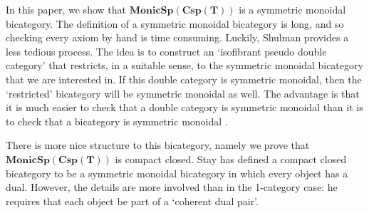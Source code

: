 \documentclass[11pt]{amsart}
\newcommand{\bimonspcsp}[1]{\mathbf{MonicSp(Csp(#1))}}
\theoremstyle{remark}
\theoremstyle{definition}
\begin{document}
In this paper, we show that $\bimonspcsp{T}$ is a symmetric monoidal bicategory. The definition of a symmetric monoidal bicategory is long, 
and so checking every axiom by hand is time consuming. 
Luckily, Shulman 
	\cite{Shul} 
provides a less tedious process. 
The idea is to construct an `isofibrant pseudo double category' that restricts, 
in a suitable sense, to the symmetric monoidal bicategory that we are interested in.  
If this double category is symmetric monoidal, 
then the `restricted' bicategory will be symmetric monoidal as well.  
The advantage is that it is much easier to check that a double category is symmetric monoidal \cite{Shul} than it is to check that a bicategory is symmetric monoidal \cite{Stay}.

There is more nice structure to this bicategory, namely we prove that $\bimonspcsp{T}$ is compact closed.
Stay \cite{Stay} has defined a compact closed bicategory 
to be a symmetric monoidal bicategory in which every object has a dual. However, the details are more involved than in the 1-category case: he requires
that each object be part of a `coherent dual pair'.  
\end{document}
